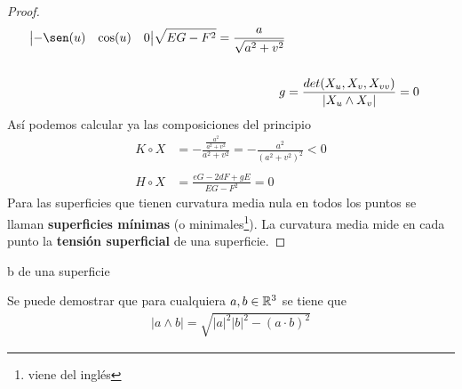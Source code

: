 \begin{ejercicio}
\begin{proof}
\begin{align*}
{\begin{vmatrix}
                -\sen(u) & \cos(u) & 0
            \end{vmatrix}}{\sqrt{EG - F^2}} = \frac{a}{\sqrt{a^2 + v^2}}\\\\
            g &= \frac{det(X_u, X_v, X_{vv})}{|X_u \wedge X_v|} = 0
        \end{align*}
        Así podemos calcular ya las composiciones del principio
        \begin{align*}
            K \circ X &= -\frac{\frac{a^2}{a^2+v^2}}{a^2 + v^2} = - \frac{a^2}{(a^2 + v^2)^2} < 0\\\\
            H \circ X &= \frac{eG - 2dF + gE}{EG - F^2} = 0
        \end{align*}
        Para las superficies que tienen curvatura media nula en todos los puntos se llaman \textbf{superficies mínimas} (o minimales\footnote{viene del inglés}). La curvatura media mide en cada punto la \textbf{tensión superficial} de una superficie.
    \end{proof}b de una superficie
\end{ejercicio}

\begin{observacion}
    Se puede demostrar que para cualquiera $a,b\in \mathbb{R}^3$ se tiene que 
    \begin{gather*}
        |a \wedge b| = \sqrt{|a|^2|b|^2 - (a \cdot b)^2}
    \end{gather*}
\end{observacion}

